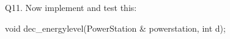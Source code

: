 Q11.
Now implement and test this:
\begin{console}
void dec_energylevel(PowerStation & powerstation, int d);
\end{console}


